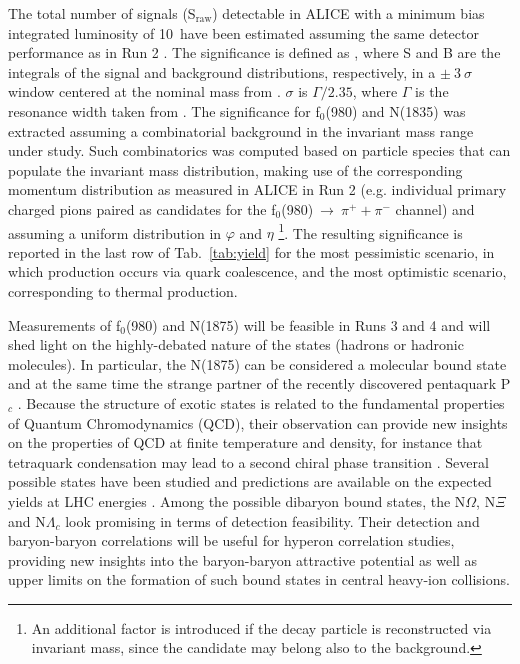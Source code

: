 The total number of signals (S$_{\mathrm{raw}}$) detectable in ALICE with a minimum bias \PbPb integrated luminosity of 10~\nbInv have been estimated assuming the same detector performance as in Run 2 \cite{Jacazio:2017dvy, Acharya:2018ckj}. 
The significance is defined as \significance, where S and B are the integrals of the signal and background distributions, respectively, in a $\pm~3~\sigma$ window centered at the nominal mass from \cite{pdg:2018}. 
$\sigma$ is $\Gamma/2.35$, where $\Gamma$ is the resonance width taken from \cite{pdg:2018}. 
The significance for f$_0$(980) and N(1835) was extracted assuming a combinatorial background in the invariant mass range under study. 
Such combinatorics was computed based on particle species that can populate the invariant mass distribution, 
making use of the corresponding momentum distribution as measured in ALICE in Run 2 (e.g. individual primary charged pions paired as candidates for the f$_{0}$(980)$~\rightarrow~\pi^{+}+\pi^{-}$ channel)
and assuming a uniform distribution in $\varphi$ and $\eta$ \footnote{An additional factor is introduced if the decay particle is reconstructed via invariant mass, since the candidate may belong also to the background.}.
The resulting significance is reported in the last row of Tab.~\ref{tab:yield} for the most pessimistic scenario, in which production occurs via quark coalescence, and the most optimistic scenario, corresponding to thermal production. 


Measurements of f$_{0}$(980) and N(1875) will be feasible in Runs 3 and 4 and will shed light on the highly-debated nature of the states (hadrons or hadronic molecules). 
In particular, the N(1875) can be considered a molecular bound state and at the same time the strange partner of the recently discovered pentaquark P$_{c}$ \cite{He:2017aps}. 
Because the structure of exotic states is related to the fundamental properties of Quantum Chromodynamics (QCD), their observation can provide new insights on the properties of QCD at finite temperature and density, for instance that tetraquark condensation may lead to a second chiral phase transition \cite{Cho:2017dcy}.
Several possible states have been studied and predictions are available on the expected yields at LHC energies \cite{Cho:2017dcy}. Among the possible dibaryon bound states, the N$\Omega$, N$\Xi$ and N$\Lambda_c$ look promising in terms of detection feasibility. Their detection and baryon-baryon correlations will be useful for hyperon correlation studies, providing new insights into the baryon-baryon attractive potential as well as upper limits on the formation of such bound states in central heavy-ion collisions.

